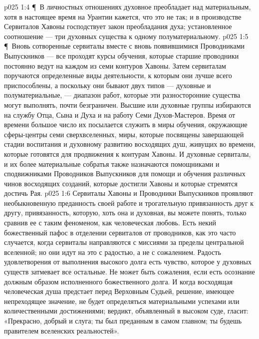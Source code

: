 \vs p025 1:4 \P\ В личностных отношениях духовное преобладает над материальным, хотя в настоящее время на Урантии кажется, что это не так; и в производстве Сервиталов Хавоны господствует закон преобладания духа; установленное соотношение --- три духовных существа к одному полуматериальному.
\vs p025 1:5 \P\ Вновь сотворенные сервиталы вместе с вновь появившимися Проводниками Выпускников --- все проходят курсы обучения, которые старшие проводники постоянно ведут на каждом из семи контуров Хавоны. Затем сервиталам поручаются определенные виды деятельности, к которым они лучше всего приспособлены, а поскольку они бывают двух типов --- духовные и полуматериальные, --- диапазон работ, которые эти разносторонние существа могут выполнять, почти безграничен. Высшие или духовные группы избираются на службу Отца, Сына и Духа и на работу Семи Духов\hyp{}Мастеров. Время от времени большое число их посылается служить в миры обучения, окружающие сферы\hyp{}центры семи сверхвселенных, миры, которые посвящены завершающей стадии воспитания и духовному развитию восходящих душ, живущих во времени, которые готовятся для продвижения к контурам Хавоны. И духовные сервиталы, и их более материальные собратья также назначаются помощниками и сподвижниками Проводников Выпускников для помощи и обучения различных чинов восходящих созданий, которые достигли Хавоны и которые стремятся достичь Рая.
\vs p025 1:6 Сервиталы Хавоны и Проводники Выпускников проявляют необыкновенную преданность своей работе и трогательную привязанность друг к другу, привязанность, которую, хоть она и духовная, вы можете понять, только сравнив ее с таким феноменом, как человеческая любовь. Есть некий божественный пафос в отделении сервиталов от проводников, как это часто случается, когда сервиталы направляются с миссиями за пределы центральной вселенной; но они идут на это с радостью, а не с сожалением. Радость удовлетворения от выполнения высокого долга есть чувство, которое у духовных существ затмевает все остальные. Не может быть сожаления, если есть осознание должным образом исполненного божественного долга. И когда восходящая человеческая душа предстает перед Верховным Судьей, решение, имеющее непреходящее значение, не будет определяться материальными успехами или количественными достижениями; вердикт, объявленный в высоком суде, гласит: «Прекрасно, добрый и  слуга; ты был преданным в самом главном; ты будешь правителем вселенских реальностей».

